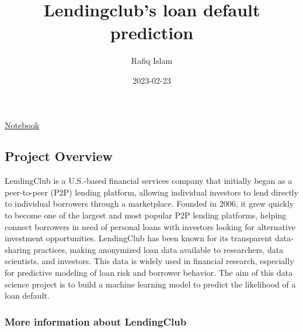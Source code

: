 \documentclass[
  letterpaper,
  DIV=11,
  numbers=noendperiod]{scrartcl}
\title{Lendingclub's loan default prediction}
\author{Rafiq Islam}
\date{2023-02-23}
\renewcommand*\contentsname{Table of contents}
\newcommand\contentsname{Table of contents}
\begin{document}
\maketitle

\renewcommand*\contentsname{Table of contents}
{
\setcounter{tocdepth}{4}
\tableofcontents
}

\href{../../../codepages/lendingclub/index.qmd}{Notebook}

\subsection{Project Overview}\label{project-overview}

LendingClub is a U.S.-based financial services company that initially
began as a peer-to-peer (P2P) lending platform, allowing individual
investors to lend directly to individual borrowers through a
marketplace. Founded in 2006, it grew quickly to become one of the
largest and most popular P2P lending platforms, helping connect
borrowers in need of personal loans with investors looking for
alternative investment opportunities. LendingClub has been known for its
transparent data-sharing practices, making anonymized loan data
available to researchers, data scientists, and investors. This data is
widely used in financial research, especially for predictive modeling of
loan risk and borrower behavior. The aim of this data science project is
to build a machine learning model to predict the likelihood of a loan
default.

\subsubsection{More information about
LendingClub}\label{more-information-about-lendingclub}
\end{document}
